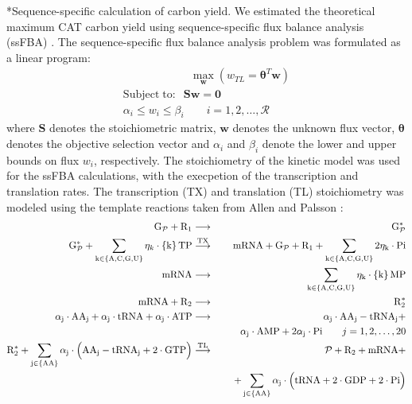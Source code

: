 \documentclass[12pt]{article}
\makeatletter
\renewcommand\subsection{\@startsection
	{subsection}{2}{0mm}
	{-0.05in}
	{-0.5\baselineskip}
	{\normalfont\normalsize\bfseries}}
\makeatother
\begin{document}
\subsection*{Sequence-specific calculation of carbon yield.}
We estimated the theoretical maximum CAT carbon yield using sequence-specific flux balance analysis (ssFBA) \cite{Allen:2003aa}.
The sequence-specific flux balance analysis problem was formulated as a linear program:
\begin{equation}
 \begin{multlined}
	\qquad \qquad \qquad \max_{\boldsymbol{w}}{} \! \left( w_{TL} = \mathbf{\boldsymbol{\theta}}^T \boldsymbol{w} \right) \\
	\mathrm{Subject \; to:}
	 \; \; \mathbf{S}\mathbf{w}=\mathbf{0} \\
\alpha_i \leq w_i \leq \beta_i  \qquad i=1,2,\hdots,\mathcal{R}
 \end{multlined}
\end{equation}
where $\mathbf{S}$ denotes the stoichiometric matrix, $\mathbf{w}$ denotes the unknown flux vector, $\boldsymbol{\theta}$ denotes the objective selection vector
and $\alpha_i$ and $\beta_i$ denote the lower and upper bounds on flux $w_{i}$, respectively.
The stoichiometry of the kinetic model was used for the ssFBA calculations, with the execpetion of the transcription and translation rates.
The transcription (TX) and translation (TL) stoichiometry was modeled using the template reactions taken from Allen and Palsson \cite{Allen:2003aa}:
\begin{eqnarray*}
\mathrm{{G}_{\mathcal{P}}}+\mathrm{{R}_{1}} &\longrightarrow& \mathrm{G_{\mathcal{P}}^{*}} \\
\mathrm{G_{\mathcal{P}}^{*}}+\sum_{\mathrm{k\in\left\{A,C,G,U\right\}}}\eta_{k}\cdot \mathrm{\left\{k\right\}TP} &\overset{\rm TX}{\longrightarrow}& \mathrm{mRNA}+\mathrm{G_{\mathcal{P}}}+\mathrm{R_{1}}+ \mathrm{\sum_{k\in\left\{A,C,G,U\right\}}2\eta_{k}\cdot Pi}\\
\mathrm{mRNA} &\longrightarrow& \mathrm{\sum_{k\in\left\{A,C,G,U\right\}}\eta_{k}\cdot \left\{k\right\}MP} \\
\mathrm{mRNA}+\mathrm{R_{2}} &\longrightarrow& \mathrm{R_{2}^{*}} \\
\mathrm{\alpha_{j}\cdot AA_{j}+\alpha_{j}\cdot tRNA+\alpha_{j}\cdot ATP} &\longrightarrow& \mathrm{\alpha_{j}\cdot AA_{j}-tRNA_{j}+}\\
&& \mathrm{\qquad \alpha_{j}\cdot AMP+2\alpha_{j}\cdot Pi} \qquad{j=1,2,\hdots,20}\\
\mathrm{R_{2}^{*}+\sum_{j\in\left\{AA\right\}}\alpha_{j}\cdot \Big(AA_{j}-tRNA_{j}+2\cdot GTP\Big)} &\stackrel{\rm TL}{\longrightarrow}& \mathcal{P}+\mathrm{R_{2}+mRNA}+\\
&& \mathrm{\quad +\sum_{j\in\left\{AA\right\}}\alpha_{j}\cdot\Big(tRNA+2\cdot GDP+2\cdot Pi\Big)}
\end{eqnarray*}
\end{document}
